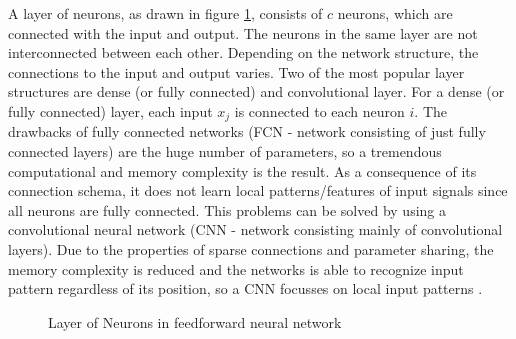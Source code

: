 \documentclass[12pt,DIV14,BCOR12mm,a4paper,footexclude,headinclude,halfparskip-,twoside,openright,cleardoubleempty,idxtotoc,bibtotoc,listtotoc,abstracton]{scrreprt} %
\numberwithin{equation}{chapter}
\begin{document}
A layer of neurons, as drawn in figure \ref{fig:Layer_of_neurons}, consists of $c$ neurons, which are connected with the input and output. The neurons in the same layer are not interconnected between each other. Depending on the network structure, the connections to the input and output varies. Two of the most popular layer structures are dense (or fully connected) and convolutional layer. For a dense (or fully connected) layer, each input $x_{j}$ is connected to each neuron $i$. The drawbacks of fully connected networks (FCN - network consisting of just fully connected layers) are the huge number of parameters, so a tremendous computational and memory complexity is the result. As a consequence of its connection schema, it does not learn local patterns/features of input signals since all neurons are fully connected. This problems can be solved by using a convolutional neural network (CNN - network consisting mainly of convolutional layers). Due to the properties of sparse connections and parameter sharing, the memory complexity is reduced and the networks is able to recognize input pattern regardless of its position, so a CNN focusses on local input patterns \cite{LectureNotes_DeepLearning}.
\begin{figure}[htb!]
	\centering
	\qquad
	\caption{Layer of Neurons in feedforward neural network}
	\label{fig:Layer_of_neurons}
\end{figure}
\end{document}
